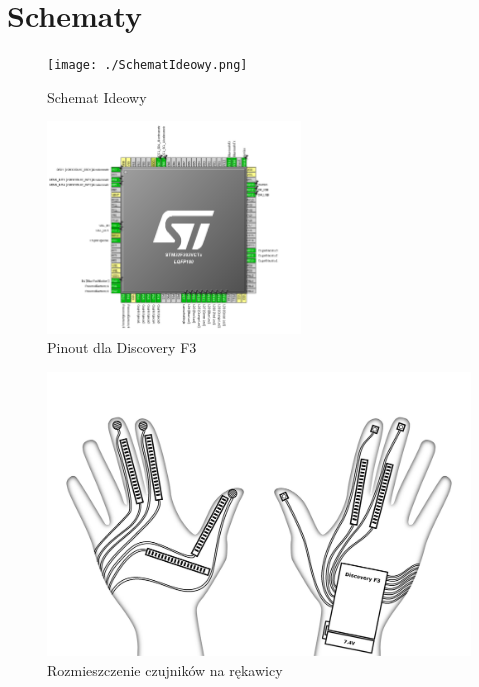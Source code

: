 \documentclass[12pt,a4paper]{article}
\begin{document}
\section{Schematy}
\begin{figure}[!htb]
\texttt{[image: ./SchematIdeowy.png]}
\caption{Schemat Ideowy}
\end{figure}
\begin{figure}[!htb]
\centering
\includegraphics[width=0.6\textwidth]{./pinout.png}
\caption{Pinout dla Discovery F3}
\end{figure}
\begin{figure}[!htb]
\centering
\includegraphics[width=\textwidth]{./rekawica.jpg}
\caption{Rozmieszczenie czujników na rękawicy}
\end{figure}
\end{document}
